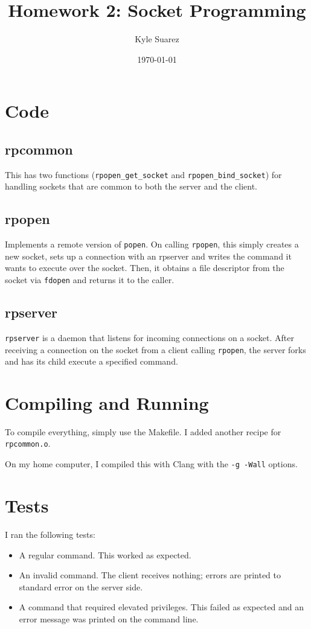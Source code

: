 \documentclass{article}
\begin{document}
\title{Homework 2: Socket Programming}
\author{Kyle Suarez}
\date{\today}
\maketitle

\section{Code}
\subsection{rpcommon}
This has two functions (\texttt{rpopen_get_socket} and
\texttt{rpopen_bind_socket}) for handling sockets that are common to both the
server and the client.

\subsection{rpopen}
Implements a remote version of \texttt{popen}. On calling \texttt{rpopen},
this simply creates a new socket, sets up a connection with an rpserver and
writes the command it wants to execute over the socket. Then, it obtains a file
descriptor from the socket via \texttt{fdopen} and returns it to the caller.

\subsection{rpserver}
\texttt{rpserver} is a daemon that listens for incoming connections on a socket.
After receiving a connection on the socket from a client calling
\texttt{rpopen}, the server forks and has its child execute a specified command.

\section{Compiling and Running}
To compile everything, simply use the Makefile. I added another recipe for
\texttt{rpcommon.o}.

On my home computer, I compiled this with Clang with the \texttt{-g -Wall}
options.

\section{Tests}
I ran the following tests:
\begin{itemize}
    \item A regular command. This worked as expected.
    \item An invalid command. The client receives nothing; errors are printed to
    standard error on the server side.
    \item A command that required elevated privileges. This failed as expected
    and an error message was printed on the command line.
\end{itemize}
\end{document}
